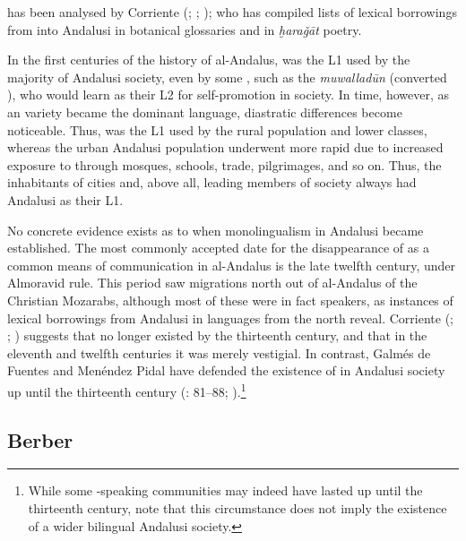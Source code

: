 \documentclass[output=paper,modfonts,nonflat]{langsci/langscibook}
\begin{document}
 has been analysed by Corriente (\citeyear{Corriente1995}; \citeyear{Corriente2000}; \citeyear{Corriente2012}); who has compiled lists of lexical borrowings from  into Andalusi  in botanical glossaries and in \textit{ḫaraǧāt} poetry.  

In the first centuries of the history of al-Andalus,  was the L1 used by the majority of Andalusi society, even by some , such as the \textit{muwalladūn} (converted ), who would learn  as their L2 for self-promotion in society. In time, however, as an  variety became the dominant language, diastratic differences become noticeable. Thus,  was the L1 used by the rural population and lower classes, whereas the urban Andalusi population underwent more rapid  due to increased exposure to  through mosques, schools, trade, pilgrimages, and so on. Thus, the inhabitants of cities and, above all, leading members of society always had Andalusi  as their L1. 

No concrete evidence exists as to when monolingualism in Andalusi  became established. The most commonly accepted date for the disappearance of  as a common means of communication in al-Andalus is the late twelfth century, under Almoravid rule. This period saw migrations north out of al-Andalus of the Christian Mozarabs, although most of these were in fact  speakers, as instances of lexical borrowings from Andalusi  in  languages from the north reveal. Corriente (\citeyear{Corriente1997dictionary}; \citeyear[443]{Corriente1992book}; \citeyear{Corriente2005}) suggests that  no longer existed by the thirteenth century, and that in the eleventh and twelfth centuries it was merely vestigial. In contrast, Galmés de Fuentes and Menéndez Pidal have defended the existence of  in Andalusi society up until the thirteenth century (\citealt{GalmésdeFuentes1994}: 81–88; \citealt{MenéndezPidalGalmésdeFuentes2001}).\footnote{While some -speaking communities may indeed have lasted up until the thirteenth century, note that this circumstance does not imply the existence of a wider bilingual Andalusi society.} 

\subsection{Berber}\largerpage
\end{document}
